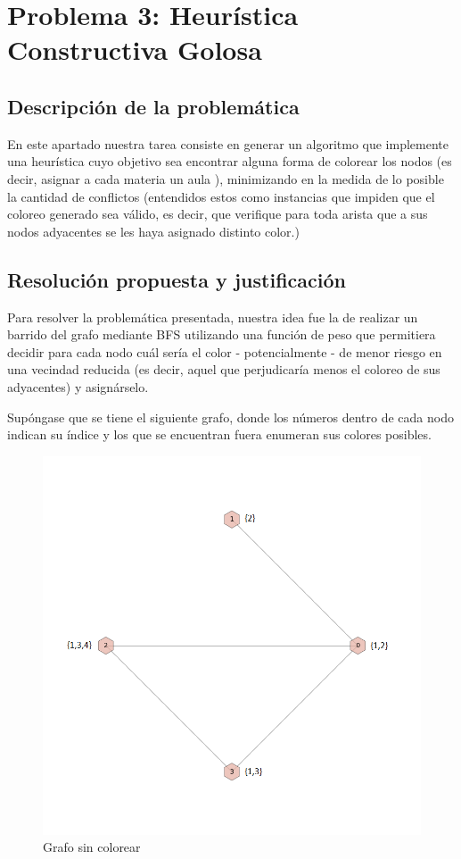 \section{Problema 3: Heurística Constructiva Golosa}

\subsection{Descripción de la problemática}
En este apartado nuestra tarea consiste en generar un algoritmo que implemente una heurística cuyo objetivo sea encontrar alguna forma de colorear los nodos (es decir, asignar a cada materia un aula ), minimizando en la medida de lo posible la cantidad de conflictos (entendidos estos como instancias que impiden que el coloreo generado sea válido, es decir, que verifique para toda arista que a sus nodos adyacentes se les haya asignado distinto color.) 


\subsection{Resolución propuesta y justificación}
Para resolver la problemática presentada, nuestra idea fue la de realizar un barrido del grafo mediante BFS utilizando una función de peso que permitiera decidir para cada nodo cuál sería el color - potencialmente - de menor riesgo en una vecindad reducida (es decir, aquel que perjudicaría menos el coloreo de sus adyacentes) y asignárselo.

Supóngase que se tiene el siguiente grafo, donde los números dentro de cada nodo indican su índice y los que se encuentran fuera enumeran sus colores posibles.\\

 \begin{figure}[H]
    \begin{center}
  	\includegraphics[width=13cm]{imagenes/Ej3/4Nodos0.png}
 	\caption{Grafo sin colorear}
 	\label{sinColor}
    \end{center}
  \end{figure}


